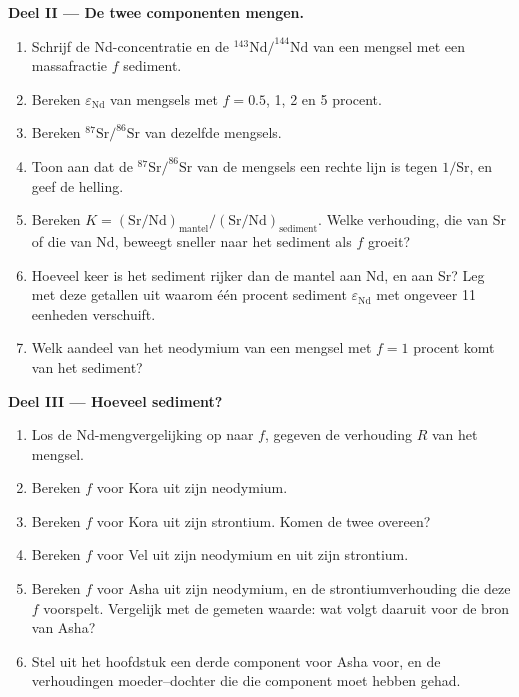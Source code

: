 \begin{problem}
\noindent\textbf{Deel II --- De twee componenten mengen.}
\begin{enumerate}[resume]
\item Schrijf de Nd-concentratie en de $^{143}\mathrm{Nd}/^{144}\mathrm{Nd}$ van een
mengsel met een massafractie $f$ sediment.
\item Bereken $\varepsilon_{\mathrm{Nd}}$ van mengsels met $f = 0.5$, 1, 2 en 5
procent.
\item Bereken $^{87}\mathrm{Sr}/^{86}\mathrm{Sr}$ van dezelfde mengsels.
\item Toon aan dat de $^{87}\mathrm{Sr}/^{86}\mathrm{Sr}$ van de mengsels een rechte
lijn is tegen $1/\mathrm{Sr}$, en geef de helling.
\item Bereken $K = (\mathrm{Sr}/\mathrm{Nd})_{\text{mantel}}/(\mathrm{Sr}/\mathrm{Nd})_{\text{sediment}}$.
Welke verhouding, die van Sr of die van Nd, beweegt sneller naar het sediment als $f$ groeit?
\item Hoeveel keer is het sediment rijker dan de mantel aan Nd, en aan Sr?
Leg met deze getallen uit waarom één procent sediment
$\varepsilon_{\mathrm{Nd}}$ met ongeveer 11 eenheden verschuift.
\item Welk aandeel van het neodymium van een mengsel met $f = 1$ procent komt van het
sediment?
\end{enumerate}

\noindent\textbf{Deel III --- Hoeveel sediment?}
\begin{enumerate}[resume]
\item Los de Nd-mengvergelijking op naar $f$, gegeven de verhouding $R$ van het mengsel.
\item Bereken $f$ voor Kora uit zijn neodymium.
\item Bereken $f$ voor Kora uit zijn strontium. Komen de twee overeen?
\item Bereken $f$ voor Vel uit zijn neodymium en uit zijn strontium.
\item Bereken $f$ voor Asha uit zijn neodymium, en de strontiumverhouding die deze $f$
voorspelt. Vergelijk met de gemeten waarde: wat volgt daaruit voor de bron van
Asha?
\item Stel uit het hoofdstuk een derde component voor Asha voor, en de
verhoudingen moeder--dochter die die component moet hebben gehad.
\end{enumerate}


\end{problem}
